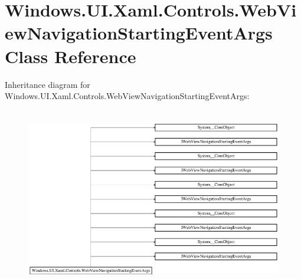 \hypertarget{class_windows_1_1_u_i_1_1_xaml_1_1_controls_1_1_web_view_navigation_starting_event_args}{}\section{Windows.\+U\+I.\+Xaml.\+Controls.\+Web\+View\+Navigation\+Starting\+Event\+Args Class Reference}
\label{class_windows_1_1_u_i_1_1_xaml_1_1_controls_1_1_web_view_navigation_starting_event_args}
Inheritance diagram for Windows.\+U\+I.\+Xaml.\+Controls.\+Web\+View\+Navigation\+Starting\+Event\+Args\+:\begin{figure}[H]
\begin{center}
\leavevmode
\includegraphics[height=7.958656cm]{class_windows_1_1_u_i_1_1_xaml_1_1_controls_1_1_web_view_navigation_starting_event_args}
\end{center}
\end{figure}
